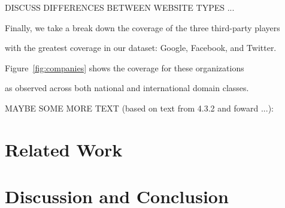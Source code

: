 \documentclass{sig-alternate-10pt}
\begin{document}
DISCUSS DIFFERENCES BETWEEN WEBSITE TYPES ...



Finally, we take a break down the coverage of the three third-party players

with the greatest coverage in our dataset: Google, Facebook, and Twitter.

Figure~\ref{fig:companies} shows the coverage for these organizations 

as observed across both national and international domain classes.





MAYBE SOME MORE TEXT (based on text from 4.3.2 and foward ...):















\section{Related Work}\label{sec:related}







\section{Discussion and Conclusion}\label{sec:conclusions}









\newpage






%

\vspace{8pt}




\end{document}
